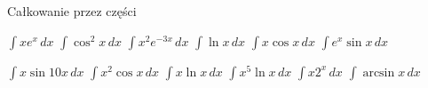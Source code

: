 \documentclass[12pt,a4paper]{article}
\begin{document}
	\begin{center}
		\Large Całkowanie przez części
	\end{center}\normalsize
	
	{$\displaystyle \int xe^x\, dx$}
	{$\displaystyle \int \cos^2x\, dx$}
	{$\displaystyle \int x^2e^{-3x}\, dx$}
	{$\displaystyle \int \ln x\, dx$}
	{$\displaystyle \int x\cos x\, dx$}
	{$\displaystyle \int e^x\sin x\, dx$}
	
	\vspace{0.4cm}
	
	{$\displaystyle \int x\sin 10x\, dx$}
	{$\displaystyle \int x^2\cos x\, dx$}
	{$\displaystyle \int x\ln x\, dx$}
	{$\displaystyle \int x^5\ln x\, dx$}
	{$\displaystyle \int x2^x\, dx$}
	{$\displaystyle \int \arcsin x\, dx$}
	
	
	
\end{document}
